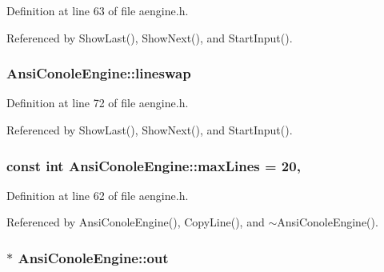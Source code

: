 Definition at line 63 of file aengine.\+h.



Referenced by Show\+Last(), Show\+Next(), and Start\+Input().

\subsubsection[{\texorpdfstring{lineswap}{lineswap}}]{ Ansi\+Conole\+Engine\+::lineswap\hspace{0.3cm}{\ttfamily [private]}}\hypertarget{classAnsiConoleEngine_a23b1b0d4714995d12e7b0aacdecfa0c4}{}\label{classAnsiConoleEngine_a23b1b0d4714995d12e7b0aacdecfa0c4}


Definition at line 72 of file aengine.\+h.



Referenced by Show\+Last(), Show\+Next(), and Start\+Input().

\subsubsection[{\texorpdfstring{max\+Lines}{maxLines}}]{\setlength{\rightskip}{0pt plus 5cm}const int Ansi\+Conole\+Engine\+::max\+Lines = 20\hspace{0.3cm}{\ttfamily [static]}, {\ttfamily [private]}}\hypertarget{classAnsiConoleEngine_a3f94786b1610ac3f038d5115fd8047a3}{}\label{classAnsiConoleEngine_a3f94786b1610ac3f038d5115fd8047a3}


Definition at line 62 of file aengine.\+h.



Referenced by Ansi\+Conole\+Engine(), Copy\+Line(), and $\sim$\+Ansi\+Conole\+Engine().

\subsubsection[{\texorpdfstring{out}{out}}]{$\ast$ Ansi\+Conole\+Engine\+::out\hspace{0.3cm}{\ttfamily [private]}}\hypertarget{classAnsiConoleEngine_ad6a604fc0a0f544907513076c72434f3}{}\label{classAnsiConoleEngine_ad6a604fc0a0f544907513076c72434f3}


